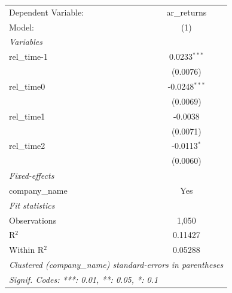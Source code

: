 
\begingroup
\centering
\begin{tabular}{lc}
   \tabularnewline \midrule \midrule
   Dependent Variable: & ar\_returns\\   
   Model:              & (1)\\  
   \midrule
   \emph{Variables}\\
   rel\_time-1         & 0.0233$^{***}$\\   
                       & (0.0076)\\   
   rel\_time0          & -0.0248$^{***}$\\   
                       & (0.0069)\\   
   rel\_time1          & -0.0038\\   
                       & (0.0071)\\   
   rel\_time2          & -0.0113$^{*}$\\   
                       & (0.0060)\\   
   \midrule
   \emph{Fixed-effects}\\
   company\_name       & Yes\\  
   \midrule
   \emph{Fit statistics}\\
   Observations        & 1,050\\  
   R$^2$               & 0.11427\\  
   Within R$^2$        & 0.05288\\  
   \midrule \midrule
   \multicolumn{2}{l}{\emph{Clustered (company\_name) standard-errors in parentheses}}\\
   \multicolumn{2}{l}{\emph{Signif. Codes: ***: 0.01, **: 0.05, *: 0.1}}\\
\end{tabular}
\par\endgroup


